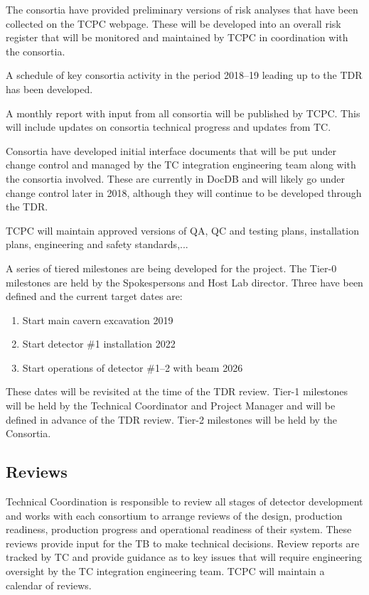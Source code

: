 The consortia have provided preliminary versions of risk analyses that
have been collected on the TCPC webpage. These will be developed into
an overall risk register that will be monitored and maintained by TCPC
in coordination with the consortia.

A schedule of key consortia activity in the period 2018--19 leading up
to the TDR has been developed.

A monthly report with input from all consortia will be published by
TCPC. This will include updates on consortia technical progress and
updates from TC.

Consortia have developed initial interface documents that will be put
under change control and managed by the TC integration engineering
team along with the consortia involved. These are currently in DocDB
and will likely go under change control later in 2018, although they
will continue to be developed through the TDR.

TCPC will maintain approved versions of QA, QC and testing plans,
installation plans, engineering and safety standards,...

A series of tiered milestones are being developed for the 
project. The Tier-0 milestones are held by the Spokespersons and Host
Lab director. Three have been defined and the current target dates
are:
\begin{enumerate}
\item Start main cavern excavation \hspace{2.1in} 2019
\item Start detector \#1 installation \hspace{2.1in} 2022
\item Start operations of detector \#1--2 with beam \hspace{1in} 2026
\end{enumerate}
These dates will be revisited at the time of the TDR review.  Tier-1
milestones will be held by the Technical Coordinator and  Project
Manager and will be defined in advance of the TDR review. Tier-2
milestones will be held by the Consortia.

\subsection{Reviews}
\label{sec:fdsp-coord-reviews}

Technical Coordination is responsible to review all stages of detector
development and works with each consortium to arrange reviews of the
design, production readiness, production progress and operational
readiness of their system.  These reviews provide input for the TB to
make technical decisions.  Review reports are tracked by TC and
provide guidance as to key issues that will require engineering
oversight by the TC integration engineering team. TCPC will maintain a
calendar of  reviews.

